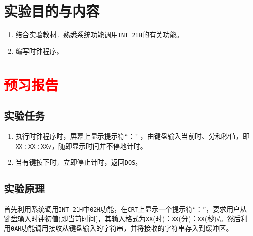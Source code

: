 \documentclass[11pt]{SEU-Digital-Report}
\begin{document}
\exptitlepage

\tableofcontents
\newpage

\section{实验目的与内容}       
\begin{enumerate}
    \item 结合实验教材\cite{book,guide}，熟悉系统功能调用\texttt{INT 21H}的有关功能。
    \item 编写时钟程序。
\end{enumerate}

\section{\textcolor{red}{预习报告}}
\subsection{实验任务}       
\begin{enumerate}
    \item 执行时钟程序时，屏幕上显示提示符“：” ，由键盘输入当前时、分和秒值，即\texttt{XX：XX：XX√}，随即显示时间并不停地计时。
    \item 当有键按下时，立即停止计时，返回\texttt{DOS}。
\end{enumerate}

\subsection{实验原理}
首先利用系统调用\texttt{INT 21H}中\texttt{02H}功能，在\texttt{CRT}上显示一个提示符“：”，要求用户从键盘输入时钟初值(即当前时间)，其输入格式为\texttt{XX}(时)：\texttt{XX}(分)：\texttt{XX}(秒)\texttt{√}。然后利用\texttt{0AH}功能调用接收从键盘输入的字符串，并将接收的字符串存入到缓冲区。
\end{document}
